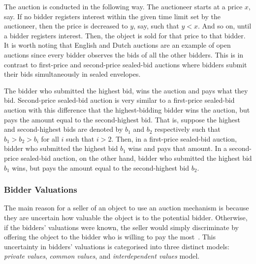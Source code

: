  The auction is conducted in the following way. The auctioneer starts at a price $x$, say. If no bidder registers interest within the given time limit set by the auctioneer, then the price is decreased to $y$, say, such that $y < x$. And so on, until a bidder registers interest. Then, the object is sold for that price to that bidder. It is worth noting that English and Dutch auctions are an example of open auctions since every bidder observes the bids of all the other bidders. This is in contrast to first-price and second-price sealed-bid auctions where bidders submit their bids simultaneously in sealed envelopes.

 The bidder who submitted the highest bid, wins the auction and pays what they bid. Second-price sealed-bid auction is very similar to a first-price sealed-bid auction with this difference that the highest-bidding bidder wins the auction, but pays the amount equal to the second-highest bid. That is, suppose the highest and second-highest bids are denoted by $b_1$ and $b_2$ respectively such that $b_1 > b_2 > b_i$ for all $i$ such that $i > 2$. Then, in a first-price sealed-bid auction, bidder who submitted the highest bid $b_1$ wins and pays that amount. In a second-price sealed-bid auction, on the other hand, bidder who submitted the highest bid $b_1$ wins, but pays the amount equal to the second-highest bid $b_2$.

\subsubsection{Bidder Valuations} %
\label{ssub:bidder_valuations_dmp}
The main reason for a seller of an object to use an auction mechanism is because they are uncertain how valuable the object is to the potential bidder. Otherwise, if the bidders' valuations were known, the seller would simply discriminate by offering the object to the bidder who is willing to pay the most~\cite{Krishna10}. This uncertainty in bidders' valuations is categorised into three distinct models: \emph{private values}, \emph{common values}, and \emph{interdependent values} model.

